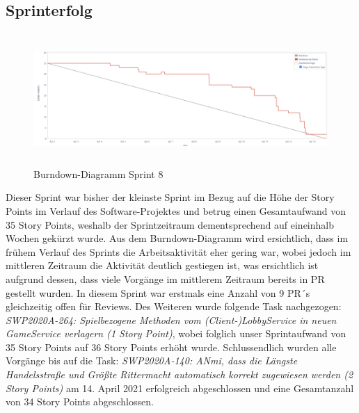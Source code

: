 \documentclass[12pt,a4paper, oneside]{article}
\begin{document}
\subsection{Sprinterfolg}
\begin{figure}[h]
    \centering
    \includegraphics[width=\textwidth, height=5cm]{../img/sprint_08/Burndown-Sprint 8.PNG}
    \caption{Burndown-Diagramm Sprint 8}
    \label{fig: Burndown-Sprint 8}
\end{figure}
\noindent
Dieser Sprint war bisher der kleinste Sprint im Bezug auf die Höhe der Story Points im Verlauf des Software-Projektes und betrug einen Gesamtaufwand von 35 Story Points, weshalb der Sprintzeitraum dementsprechend auf eineinhalb Wochen gekürzt wurde.
Aus dem Burndown-Diagramm wird ersichtlich, dass im frühem Verlauf des Sprints die Arbeitsaktivität eher gering war, wobei jedoch im mittleren Zeitraum die Aktivität deutlich gestiegen ist, was ersichtlich ist aufgrund dessen, dass viele Vorgänge im mittlerem Zeitraum bereits in PR gestellt wurden.
In diesem Sprint war erstmals eine Anzahl von 9 PR´s gleichzeitig offen für Reviews. Des Weiteren wurde folgende Task nachgezogen: \textit{SWP2020A-264: Spielbezogene Methoden vom (Client-)LobbyService in neuen GameService verlagern (1 Story Point)}, wobei folglich unser Sprintaufwand von 35 Story Points auf 36 Story Points erhöht wurde.
Schlussendlich wurden alle Vorgänge bis auf die Task: \textit{SWP2020A-140: ANmi, dass die Längste Handelsstraße und Größte Rittermacht automatisch korrekt zugewiesen werden (2 Story Points)} am 14. April 2021 erfolgreich abgeschlossen und eine Gesamtanzahl von 34 Story Points abgeschlossen.

\newpage
\end{document}
